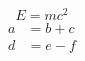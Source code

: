 \documentclass{article}
\begin{document}
\begin{equation}
E = mc^2
\end{equation}
\begin{align}
a &= b + c \\
d &= e - f
\end{align}
\end{document}
